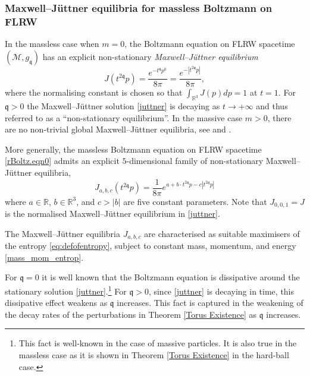 \documentclass[reqno]{amsart}
\newcommand{\pv}{p}
\def\R{\mathbb R}
\newcommand{\qq}{\mathfrak{q}}
\newcommand{\tq}{t^{\qq}}
\newcommand{\tqq}{t^{2\qq}}
\theoremstyle{definition}
\numberwithin{equation}{section}
\numberwithin{theorem}{section}
\begin{document}
\subsubsection{Maxwell--J\"uttner equilibria for massless Boltzmann on FLRW}


In the massless case when \(m=0\), the Boltzmann equation on FLRW spacetime \((\mathcal{M},g_{\qq})\) has an explicit non-stationary \emph{Maxwell--J\"uttner equilibrium}
 \begin{equation}
J ( \tqq p)
=
\frac{e^{-  \tq \pv^0}}{8\pi}=\frac{e^{- |\tqq\pv|}}{8\pi},
\label{juttner}
\end{equation}
where the normalising constant is chosen so that \(\int_{\R^3} J(p)dp=1\) at \(t=1\). For $\qq>0$ the Maxwell--J\"uttner solution \eqref{juttner} is decaying as $t \to +\infty$ and thus referred to as a ``non-stationary equilibrium''. In the massive case $m>0$, there are no non-trivial global Maxwell--J\"uttner equilibria, see \cite[Section 12.5]{CercignaniKremer2002} and \cite[Theorem 5.1]{Ellis_Maartens_MacCallum_2012}. 


More generally, the massless Boltzmann equation on FLRW spacetime \eqref{rBoltz.eqn0} admits an explicit \(5\)-dimensional family of non-stationary Maxwell--J\"uttner equilibria, 
\begin{equation}\label{equilibriageneral}
J_{a,b,c} (t^{{2\qq}}p)
=\frac{1}{8\pi}e^{a+b \cdot  t^{2\qq}p-c|t^{2\qq}p|}  
\end{equation}
where \(a\in \R\), \(b\in \R^3\), and \(c>|b|\) are five constant parameters. Note that \(J_{0,0,1}=J\) is the normalised Maxwell--J\"uttner equilibrium in \eqref{juttner}.

The Maxwell--J\"uttner equilibria \(J_{a,b,c}\) are characterised as
suitable maximisers of the entropy \eqref{eq:defofentropy}, subject to constant mass, momentum, and energy \eqref{mass_mom_entrop}.





For $\qq=0$ it is well known that the Boltzmann equation is dissipative around the stationary solution \eqref{juttner}.\footnote{This fact is well-known in the case of massive particles. It is also true in the massless case as it is shown in Theorem \ref{Torus Existence} in the hard-ball case.} For $\qq>0$, since \eqref{juttner} is decaying in time, this dissipative effect weakens as $\qq$ increases.  This fact is captured in the weakening of the decay rates of the perturbations in Theorem \ref{Torus Existence} as $\qq$ increases.
\end{document}
